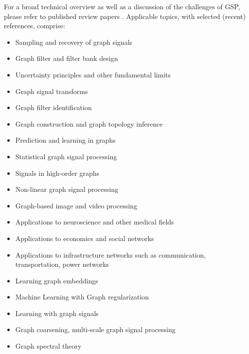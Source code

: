 \documentclass[a4paper]{scrartcl}
\newcommand{\nati}[1]{{\color[rgb]{.1,.6,.1}{#1}}}
\begin{document}
For a broad technical overview as well as a discussion of the challenges of GSP,
please refer to published review papers \cite{shuman_emerging_2013,
sandryhaila_discrete_2014, coifman_diffusion_2006, ekambaram_circulant_2013}.
Applicable topics, with selected (recent) references, comprise:
\begin{itemize}
	\setlength{\itemsep}{0pt} \setlength{\parskip}{0pt}
	\item Sampling and recovery of graph signals \cite{puy2015random,tsitsvero2015signals,anis2014towards}
	\item Graph filter and filter bank design \cite{hammond2011wavelets,narang_bior_filters,ekambaram_globalsip,leonardi_multislice,leonardi_fmri,shuman2013spectrum}
	\item Uncertainty principles and other fundamental limits \cite{perraudin2016global,agaskar_spie,pasdeloup}
	\item Graph signal transforms \cite{szlam,gavish,Maggioni_biorthogonal,coifman_diffusion_2006,lafon_coarse,narang_lifting_graphs}
	\item Graph filter identification \cite{thanou_TSP_2014}
	\item Graph construction and graph topology inference \cite{kalofolias2016learn,Dong:2014tj}
	\item Prediction and learning in graphs \nati{??????}
	\item Statistical graph signal processing \cite{perraudin2016stationary,zhang2015graph,gadde2015probabilistic}
	\item Signals in high-order graphs \nati{??????}
	\item Non-linear graph signal processing \nati{??????}
	\item Graph-based image and video processing \cite{elmoataz2008nonlocal,lezoray2008nonlocal,shahid2015fast}
	\item Applications to neuroscience and other medical fields \cite{huang2015graph,hu2015spectral}
	\item Applications to economics and social networks \nati{I do not have any references for this one.}
	\item Applications to infrastructure networks such as communication, transportation, power networks \cite{mcgraw,jain2014big,borgnat2011shared}
	\item Learning graph embeddings \cite{von2008consistency,zhou2006learning,belkin2003laplacian}
	\item Machine Learning with Graph regularization \cite{smola,belkin2005towards,zhou2004regularization,zhou2005learning,belkin2006manifold}
	\item Learning with graph signals \nati{What is the difference with the one before}
	\item Graph coarsening, multi-scale graph signal processing \cite{spielman2011graph,shuman2016multiscale,liu_coarsening,lafon_coarse,jansen}
	\item Graph spectral theory \cite{chung1997spectral,belkin2007convergence,shuman2015vertex,sandryhaila2014discrete,Nakatsukasa2013mysteries,brooks,dekel}
\end{itemize}
\end{document}
